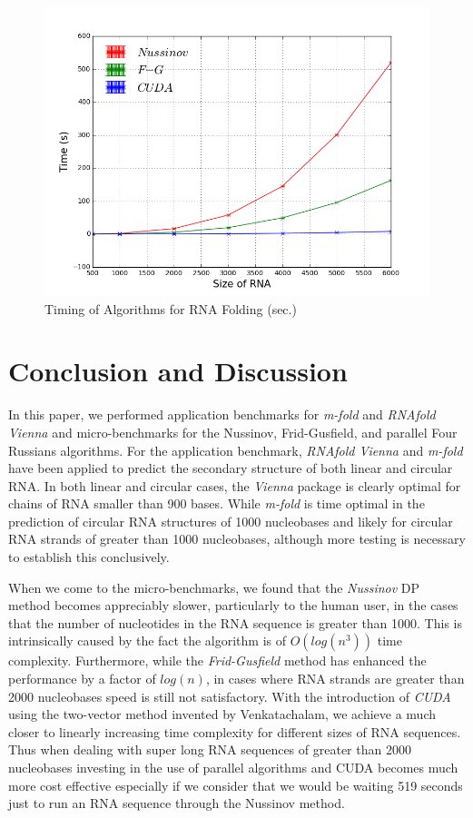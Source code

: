 \documentclass[12pt]{article}
\begin{document}
\begin{figure}[ht!]
  \centering
  \includegraphics[keepaspectratio, scale=.6]{algorithmGraph.png}
  \caption{Timing of Algorithms for RNA Folding (sec.)}
  \label{fig:timingAlgorithm}
\end{figure}

\section{Conclusion and Discussion}
\par In this paper, we performed application benchmarks for \textit{m-fold} and \textit{RNAfold Vienna} and
micro-benchmarks for the Nussinov, Frid-Gusfield, and parallel Four Russians algorithms. For the
application benchmark, \textit{RNAfold Vienna} and \textit{m-fold} have been applied to predict
the secondary structure of both linear and circular RNA. In both linear and circular cases, the
\textit{Vienna} package is clearly optimal for chains of RNA smaller than 900 bases.  While
\textit{m-fold} is time optimal in the prediction of circular RNA structures of 1000 nucleobases and likely
for circular RNA strands of greater than 1000 nucleobases, although more testing is necessary to establish this conclusively.

\par When we come to the micro-benchmarks, we found that the \textit{Nussinov} DP method becomes
appreciably slower, particularly to the human user, in the cases that the number of nucleotides in the RNA sequence is
greater than 1000. This is intrinsically caused by the fact the algorithm is of $O(log(n^3))$ time complexity.
Furthermore, while the \textit{Frid-Gusfield} method \cite{gusfield} has enhanced the performance by a factor of $log(n)$,
in cases where RNA strands are greater than 2000 nucleobases speed is still not satisfactory. With the introduction
of \textit{CUDA} using the two-vector method invented by Venkatachalam\cite{balaji}, we achieve a much closer
to linearly increasing time complexity for different sizes of RNA sequences. Thus when dealing with super long RNA
sequences of greater than 2000 nucleobases investing in the use of parallel algorithms and CUDA becomes much
more cost effective especially if we consider that we would be waiting 519 seconds just to run an RNA sequence
through the Nussinov method.
\end{document}
